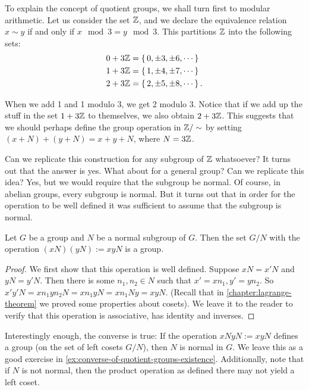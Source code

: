 \documentclass[./main.tex]{subfiles}
\begin{document}
To explain the concept of quotient groups, we shall turn first to modular
arithmetic. Let us consider the set $\mathbb{Z}$, and we declare the equivalence
relation $x \sim y$ if and only if $x \mod 3 = y \mod 3$. This partitions $\mathbb{Z}$
into the following sets:
\begin{align*}
    0 + 3\mathbb{Z} &= \set{0, \pm3, \pm6, \cdots} \\
    1 + 3\mathbb{Z} &= \set{1, \pm4, \pm7, \cdots} \\
    2 + 3\mathbb{Z} &= \set{2, \pm5, \pm8, \cdots}.
\end{align*}

When we add 1 and 1 modulo 3, we get 2 modulo 3. Notice that if we add up the
stuff in the set $1 + 3\mathbb{Z}$ to themselves, we also obtain $2 + 3\mathbb{Z}$. This
suggests that we should perhaps define the group operation in $\mathbb{Z} / \sim$ by
setting $(x + N) + (y + N) = x + y + N$, where $N = 3 \mathbb{Z}$. 

Can we replicate this construction for any subgroup of $\mathbb{Z}$ whatsoever? It
turns out that the answer is yes. What about for a general group? Can we
replicate this idea? Yes, but we would require that the subgroup be normal.  Of
course, in abelian groups, every subgroup is normal. But it turns out that in
order for the operation to be well defined it was sufficient to assume that the
subgroup is normal. 
\begin{theorem}
\label{thm:existence-of-quotient-groups}
    Let $G$ be a group and $N$ be a normal subgroup of $G$. Then the set $G/N$
    with the operation $(xN)(yN) := xyN$ is a group.
\end{theorem}
\begin{proof}
    We first show that this operation is well defined. Suppose $xN = x'N$ and
    $yN = y'N$. Then there is some $n_1, n_2 \in N$ such that $x' = x n_1, y' =
    yn_2$. So $x'y'N = x n_1 y n_2 N = x n_1 y N = x n_1 N y = xyN$. (Recall
    that in \cref{chapter:lagrange-theorem} we proved some properties about
    cosets). We leave it to the reader to verify that this operation is
    associative, has identity and inverses.
\end{proof}

Interestingly enough, the converse is true: If the operation $xN yN := xyN$
defines a group (on the set of left cosets $G/N$), then $N$ is normal in $G$. We
leave this as a good exercise in \cref{ex:converse-of-quotient-groups-existence}.
Additionally, note that if $N$ is not normal, then the product operation as
defined there may not yield a left coset. 
\end{document}
